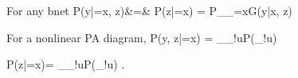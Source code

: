 For any bnet
\beqa
P(y|\rho\rvx=x, z)&=&
{P(z|\rho\rvx=x)}
=
P_{\rho_{\rvx=x}G}(y|x, z)
\eeqa

For a nonlinear PA diagram,
\beq
P(y, z|\rho\rvx=x)
=
\sum_{\pi_{!\rvx}u}P(\pi_{!\rvx}u)
\delta[y, y(\pi_{!\rvx}u,x)]
\delta[z, z(\pi_{!\rvx}u,x)]
\eeq

\beq
P(z|\rho\rvx=x)=
\sum_{\pi_{!\rvx}u}P(\pi_{!\rvx}u)
\delta[z, z(\pi_{!\rvx}u,x)]
\;.
\eeq